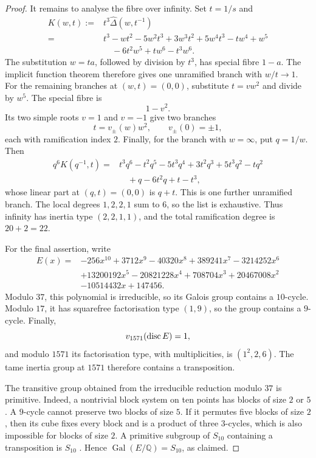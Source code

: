 \begin{proof}
It remains to analyse the fibre over infinity. Set \(t=1/s\) and
\[
\begin{aligned}
 K(w,t):={}&t^3\widehat\Delta(w,t^{-1})\\
 ={}&t^3-wt^2-5w^2t^3+3w^3t^2+5w^4t^3-tw^4+w^5\\
    &\quad-6t^2w^5+tw^6-t^3w^6.
\end{aligned}
\]
The substitution \(w=ta\), followed by division by \(t^3\), has
special fibre \(1-a\). The implicit function theorem therefore gives
one unramified branch with \(w/t\to1\). For the remaining branches at
\((w,t)=(0,0)\), substitute \(t=vw^2\) and divide by \(w^5\). The
special fibre is
\[
  1-v^2.
\]
Its two simple roots \(v=1\) and \(v=-1\) give two branches
\[
  t=v_\pm(w)w^2,
  \qquad v_\pm(0)=\pm1,
\]
each with ramification index \(2\). Finally, for the branch with
\(w=\infty\), put \(q=1/w\). Then
\[
\begin{aligned}
 q^6K(q^{-1},t)
 ={}&t^3q^6-t^2q^5-5t^3q^4+3t^2q^3+5t^3q^2-tq^2\\
    &\quad+q-6t^2q+t-t^3,
\end{aligned}
\]
whose linear part at \((q,t)=(0,0)\) is \(q+t\). This is one further
unramified branch. The local degrees \(1,2,2,1\) sum to \(6\), so the
list is exhaustive. Thus infinity has inertia type \((2,2,1,1)\), and
the total ramification degree is \(20+2=22\).

For the final assertion, write
\[
\begin{aligned}
 E(x)={}&-256x^{10}+3712x^9-40320x^8+389241x^7-3214252x^6\\
 &+13200192x^5-20821228x^4+708704x^3+20467008x^2\\
 &-10514432x+147456.
\end{aligned}
\]
Modulo \(37\), this polynomial is irreducible, so its Galois group
contains a \(10\)-cycle. Modulo \(17\), it has squarefree factorisation
type \((1,9)\), so the group contains a \(9\)-cycle. Finally,
\[
  v_{1571}(\operatorname{disc} E)=1,
\]
and modulo \(1571\) its factorisation type, with multiplicities, is
\((1^2,2,6)\). The tame inertia group at \(1571\) therefore contains a
transposition.

The transitive group obtained from the irreducible reduction modulo
\(37\) is primitive. Indeed, a nontrivial block system on ten points
has blocks of size \(2\) or \(5\). A \(9\)-cycle cannot preserve two
blocks of size \(5\). If it permutes five blocks of size \(2\), then
its cube fixes every block and is a product of three \(3\)-cycles,
which is also impossible for blocks of size \(2\). A primitive subgroup
of \(S_{10}\) containing a transposition is \(S_{10}\)
\cite[Ch.~3, Theorem~3.3A]{Dixon1996}. Hence
\(\operatorname{Gal}(E/\mathbb Q)=S_{10}\), as claimed.
\end{proof}




